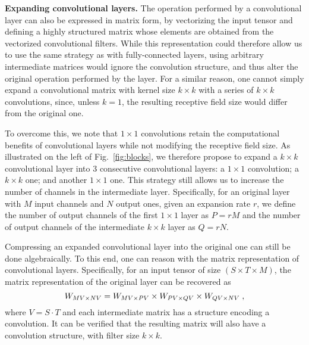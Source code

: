 \documentclass[10pt,twocolumn,letterpaper]{article}
\begin{document}
\vspace{0.2cm}\noindent\textbf{Expanding convolutional layers.} 
The operation performed by a convolutional layer can also be expressed in matrix form, by vectorizing the input tensor and defining a highly structured matrix whose elements are obtained from the vectorized convolutional filters. While this representation could therefore allow us to use the same strategy as with fully-connected layers, using arbitrary intermediate matrices would ignore the convolution structure, and thus alter the original operation performed by the layer.
For a similar reason, one cannot simply expand a convolutional matrix with kernel size $k\times k$ with a series of $k \times k$ convolutions, since, unless $k=1$, the resulting receptive field size would differ from the original one.

To overcome this, we note that $1 \times 1$ convolutions retain the computational benefits of convolutional layers while not modifying the receptive field size. As illustrated on the left of Fig.~\ref{fig:blocks}, we therefore propose to expand a $k \times k$ convolutional layer into 3 consecutive convolutional layers: a $1 \times 1$ convolution; a $k\times k$ one; and another $1 \times 1$ one. This strategy still allows us to increase the number of channels in the intermediate layer. Specifically, for an original layer with $M$ input channels and $N$ output ones, given an expansion rate $r$, we define the number of output channels of the first $1 \times 1$ layer as $P=rM$ and the number of output channels of the intermediate $k\times k$ layer as $Q=rN$.

Compressing an expanded convolutional layer into the original one can still be done algebraically. To this end, one can reason with the matrix representation of convolutional layers. Specifically, for an input tensor of size $(S\times T \times M)$, the matrix representation of the original layer can be recovered as
\begin{equation}
    \centering
    W_{MV \times NV} = W_{MV \times PV} \times W_{PV \times QV} \times W_{QV \times NV}\;,
\end{equation}
where $V = S\cdot T$ and each intermediate matrix has a structure encoding a convolution. It can be verified that the resulting matrix will also have a convolution structure, with filter size $k\times k$.
\end{document}
